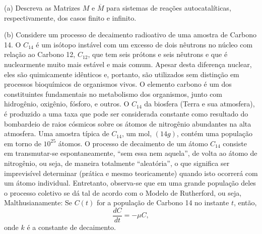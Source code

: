 \begin{exercise}
\begin{description}
\item (a) Descreva as Matrizes \(M\) e \(\overline{M}\) para sistemas de reações autocatalíticas, respectivamente, dos casos finito e infinito. 
\item (b) Considere um processo de decaimento radioativo de uma amostra de Carbono 14. O \(C_{14}\) é um isótopo instável com um excesso de dois nêutrons no núcleo com relação ao Carbono 12, \(C_{12}\), que tem seis prótons e seis nêutrons e que é nuclearmente muito mais estável e mais comum. Apesar desta diferença nuclear, eles são quimicamente idênticos e, portanto, são utilizados sem distinção em processos bioquímicos de organismos vivos. O elemento carbono é um dos constituintes fundamentais no metabolismo dos organismos, junto com hidrogênio, oxigênio, fósforo, e outros. O \(C_{14}\) da biosfera (Terra e sua atmosfera), é produzido a uma taxa que pode ser considerada constante como resultado do bombardeio de raios cósmicos sobre os átomos de nitrogênio abundantes na alta atmosfera. Uma amostra típica de \(C_{14}\), um mol, \((14g)\), contém uma população em torno de \(10^{25}\) átomos. O processo de decaimento de um átomo \(C_{14}\) consiste em transmutar-se espontaneamente, ``sem essa nem aquela'', de volta ao átomo de nitrogênio, ou seja, de maneira totalmente ``aleatória'', o que significa ser imprevisível determinar (prática e mesmo teoricamente) quando isto ocorrerá com um átomo individual. Entretanto, observa-se que em uma grande população deles o processo coletivo se dá tal de acordo com o Modelo de Rutherford, ou seja, Malthusianamente: Se \(C(t)\) for a população de Carbono 14 no instante \(t\), então,
\[\dfrac{dC}{dt} = -\mu C,\]
onde \(k\) é a constante de decaimento.
\end{description}
\end{exercise}

